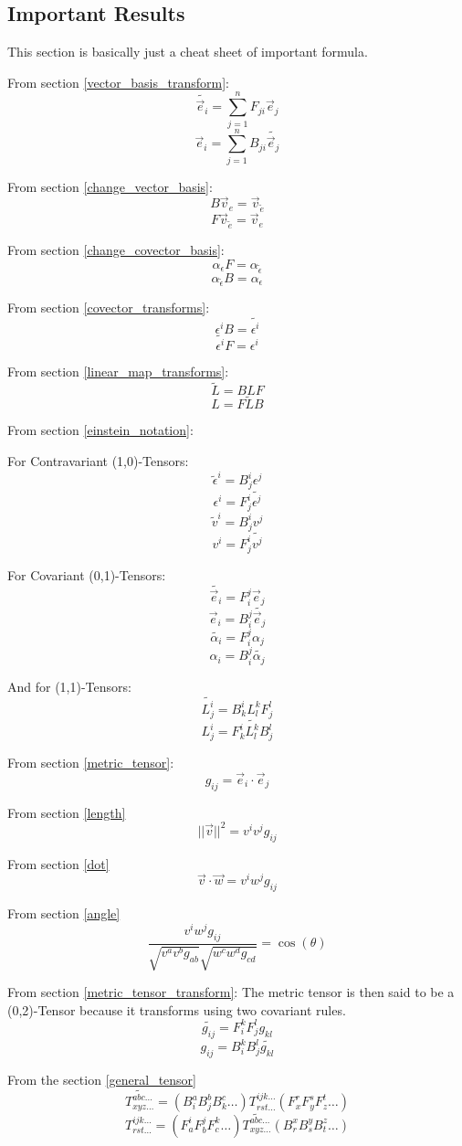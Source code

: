 \documentclass[12pt]{book}
\theoremstyle{plain}
\theoremstyle{definition}
\theoremstyle{ppart}
\theoremstyle{case}
\theoremstyle{solution}
\begin{document}
\begin{appendices}

\chapter{Important Results}

This section is basically just a cheat sheet of important formula.

From section \ref{vector_basis_transform}:
\[ \widetilde{\vec{e}_i} = \sum_{j=1}^{n} F_{ji} \vec{e}_j \]
\[ \vec{e}_i = \sum_{j=1}^{n} B_{ji} \widetilde{\vec{e}_j} \]

From section \ref{change_vector_basis}:
\[ B \vec{v}_{e} = \vec{v}_{\widetilde{e}} \]
\[ F \vec{v}_{\widetilde{e}} = \vec{v}_{e} \]

From section \ref{change_covector_basis}:
\[ \alpha_{\epsilon} F = \alpha_{\widetilde{\epsilon}} \]
\[ \alpha_{\widetilde{\epsilon}} B = \alpha_{\epsilon} \]

From section \ref{covector_transforms}:
\[ \epsilon^i B = \widetilde{\epsilon^i} \]
\[ \widetilde{\epsilon^i} F = \epsilon^i \]

From section \ref{linear_map_transforms}:
\[ \widetilde{L} = B L F \]
\[ L = F \widetilde{L} B \]

From section \ref{einstein_notation}:

For Contravariant (1,0)-Tensors:
\[ \widetilde{\epsilon}^i = B^i_j \epsilon^j \]
\[ \epsilon^i = F^i_j \widetilde{\epsilon^j} \]
\[ \widetilde{v}^i = B^i_j v^j \]
\[ v^i = F^i_j \widetilde{v^j} \]

For Covariant (0,1)-Tensors:
\[ \widetilde{\vec{e}_i} = F^j_i \vec{e}_j \]
\[ \vec{e}_i = B^j_i \widetilde{\vec{e}_j} \]
\[ \widetilde{\alpha_i} = F^j_i \alpha_j \]
\[ \alpha_i = B^j_i \widetilde{\alpha_j} \]

And for (1,1)-Tensors:
\[ \widetilde{L^i_j} = B^i_k L^k_l F^l_j \]
\[ L^i_j = F^i_k \widetilde{L^k_l} B^l_j \]

From section \ref{metric_tensor}:
\[ g_{ij} = \vec{e}_i \cdot \vec{e}_j \]

From section \ref{length}
\[ ||\vec{v}||^2 = v^i v^j g_{ij} \]

From section \ref{dot}
\[ \vec{v} \cdot \vec{w} =  v^i w^j g_{ij} \]

From section \ref{angle}
\[ \frac{v^i w^j g_{ij}}{\sqrt{v^a v^b g_{ab}} \sqrt{w^c w^d g_{cd}}} =  \cos(\theta) \]

From section \ref{metric_tensor_transform}:
The metric tensor is then said to be a (0,2)-Tensor because it transforms using
two covariant rules.
\[ \widetilde{g_{ij}} = F^k_i F^l_j g_{kl} \]
\[ g_{ij} = B^k_i B^l_j \widetilde{g_{kl}} \]

From the section \ref{general_tensor}
\[
  \widetilde{T^{abc\dots}_{xyz\dots}}
  =
  (B^a_i B^b_j B^c_k \dots) 
  T^{ijk\dots}_{rst\dots}
  (F^r_x F^s_y F^t_z \dots) 
\]
\[
  T^{ijk\dots}_{rst\dots}
  =
  (F^i_a F^j_b F^k_c \dots) 
  \widetilde{T^{abc\dots}_{xyz\dots}}
  (B^x_r B^y_s B^z_t \dots) 
\]

\end{appendices}



\end{document}
